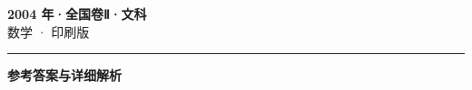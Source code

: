 \documentclass[zihao=5, a4paper]{ctexart}
\begin{document}
\begin{center}
  {\Large\bfseries 2004 年·全国卷Ⅱ·文科}\\[4pt]
  {\large 数学 · 印刷版}
\end{center}
\medskip
{}

\par\bigskip\hrule\bigskip
{}
\begin{center}{\large\bfseries 参考答案与详细解析}\end{center}
\smallskip

\end{document}
